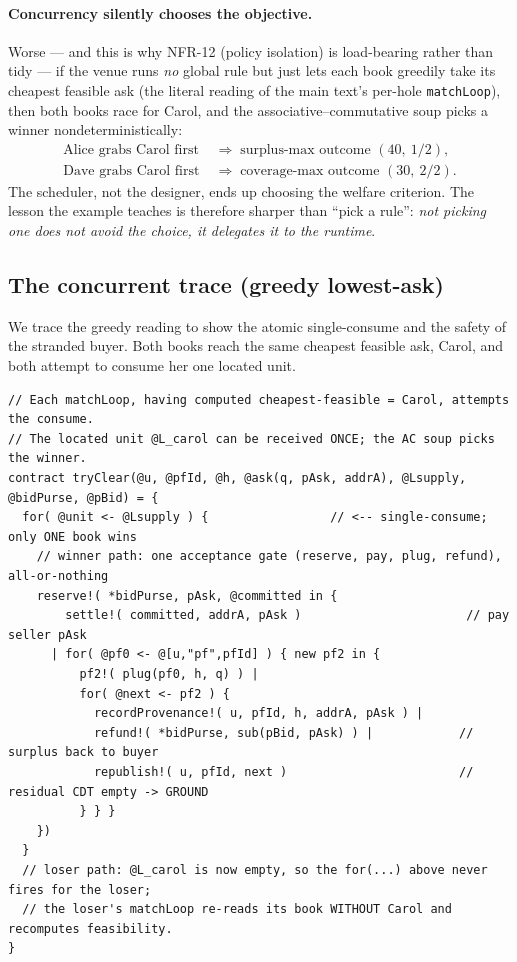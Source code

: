 \documentclass[11pt]{article}
\theoremstyle{definition}
\begin{document}
\paragraph{Concurrency silently chooses the objective.} Worse --- and this is why NFR-12 (policy
isolation) is load-bearing rather than tidy --- if the venue runs \emph{no} global rule but just lets
each book greedily take its cheapest feasible ask (the literal reading of the main text's per-hole
\texttt{matchLoop}), then both books race for Carol, and the associative--commutative soup picks a
winner nondeterministically:
\[
\begin{aligned}
\text{Alice grabs Carol first} &\;\Rightarrow\; \text{surplus-max outcome }(40,\ 1/2),\\
\text{Dave grabs Carol first}  &\;\Rightarrow\; \text{coverage-max outcome }(30,\ 2/2).
\end{aligned}
\]
The scheduler, not the designer, ends up choosing the welfare criterion. The lesson the example
teaches is therefore sharper than ``pick a rule'': \emph{not picking one does not avoid the choice, it
delegates it to the runtime}.

\subsection{The concurrent trace (greedy lowest-ask)}\label{sec:trace}
We trace the greedy reading to show the atomic single-consume and the safety of the stranded buyer.
Both books reach the same cheapest feasible ask, Carol, and both attempt to consume her one located
unit.

\begin{lstlisting}
// Each matchLoop, having computed cheapest-feasible = Carol, attempts the consume.
// The located unit @L_carol can be received ONCE; the AC soup picks the winner.
contract tryClear(@u, @pfId, @h, @ask(q, pAsk, addrA), @Lsupply, @bidPurse, @pBid) = {
  for( @unit <- @Lsupply ) {                 // <-- single-consume; only ONE book wins
    // winner path: one acceptance gate (reserve, pay, plug, refund), all-or-nothing
    reserve!( *bidPurse, pAsk, @committed in {
        settle!( committed, addrA, pAsk )                       // pay seller pAsk
      | for( @pf0 <- @[u,"pf",pfId] ) { new pf2 in {
          pf2!( plug(pf0, h, q) ) |
          for( @next <- pf2 ) {
            recordProvenance!( u, pfId, h, addrA, pAsk ) |
            refund!( *bidPurse, sub(pBid, pAsk) ) |            // surplus back to buyer
            republish!( u, pfId, next )                        // residual CDT empty -> GROUND
          } } }
    })
  }
  // loser path: @L_carol is now empty, so the for(...) above never fires for the loser;
  // the loser's matchLoop re-reads its book WITHOUT Carol and recomputes feasibility.
}
\end{lstlisting}
\end{document}

